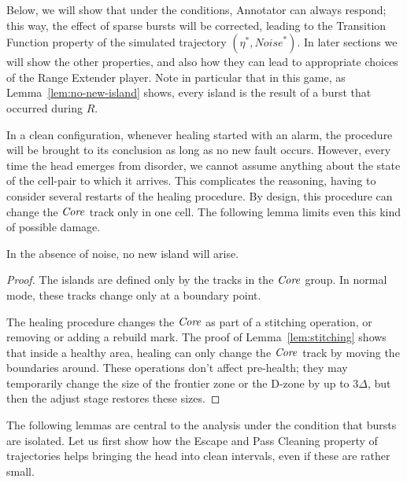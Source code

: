 \documentclass[11pt]{memoir}
\theoremstyle{definition} %
\newcommand{\fld}[1]{\ensuremath{\textit{#1\/}}}
\newcommand{\Noise}{\mathit{Noise}}
\newcommand{\Rg}{R} %
\newcommand{\Core}{\fld{Core}}
\begin{document}
Below, we will show that under the conditions, Annotator can always respond; this way,
the effect of sparse bursts will be corrected, leading to the Transition Function property
of the simulated trajectory \( (\eta^{*},\Noise^{*}) \).
In later sections we will show the other properties, and also how they can lead to appropriate
choices of the Range Extender player.
Note in particular that in this game, as Lemma~\ref{lem:no-new-island} shows,
every island is the result of a burst that occurred during \( \Rg \).
 
In a clean configuration, whenever healing started with an alarm, the procedure
will be brought to its conclusion as long as no new fault occurs.
However, every time the head emerges from disorder, we
cannot assume anything about the state of the cell-pair to which it arrives.
This complicates the reasoning, having to consider several restarts of the healing procedure.
By design, this procedure can change the \( \Core \) track only in one cell.
The following lemma limits even this kind of possible damage.

\begin{lemma}\label{lem:no-new-island}
In the absence of noise, no new island will arise.
\end{lemma}
\begin{proof}
  The islands are defined only by the tracks in the \( \Core \) group.  
In normal mode, these tracks change only at a boundary point.

The healing procedure changes the \( \Core \) as part of a stitching operation,
or removing or adding a rebuild mark.
The proof of Lemma~\ref{lem:stitching} shows that 
inside a healthy area, healing can only change the \( \Core \) track by
moving the boundaries around.
These operations don't affect pre-health; they may temporarily change the
size of the frontier zone or the D-zone by up to \( 3\Delta \), but then the
adjust stage restores these sizes.
\end{proof}

The following lemmas are central to the analysis under the condition that bursts are isolated.
Let us first show how the Escape and Pass Cleaning property of trajectories
helps bringing the head into clean intervals, even if these are rather small.
\end{document}
